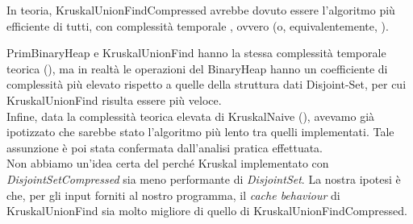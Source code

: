 \noindent In teoria, KruskalUnionFindCompressed avrebbe dovuto essere l'algoritmo più efficiente di tutti, con complessità temporale \complexityKruskalCompressed{}, ovvero \complexityMLogM{} (o, equivalentemente, \complexityMLogN{}).

\noindent PrimBinaryHeap e KruskalUnionFind hanno la stessa complessità temporale teorica \newline (\complexityMLogN{}), ma in realtà le operazioni del BinaryHeap hanno un coefficiente di complessità più elevato rispetto a quelle della struttura dati Disjoint-Set, per cui KruskalUnionFind risulta essere più veloce. \\

\noindent Infine, data la complessità teorica elevata di KruskalNaive (\complexityMN{}), avevamo già ipotizzato che sarebbe stato l'algoritmo più lento tra quelli implementati. Tale assunzione è poi stata confermata dall'analisi pratica effettuata. \\

\noindent Non abbiamo un'idea certa del perché Kruskal implementato con \textit{DisjointSetCompressed} sia meno performante di \textit{DisjointSet}. La nostra ipotesi è che, per gli input forniti al nostro programma, il \textit{cache behaviour} di KruskalUnionFind sia molto migliore di quello di KruskalUnionFindCompressed.
